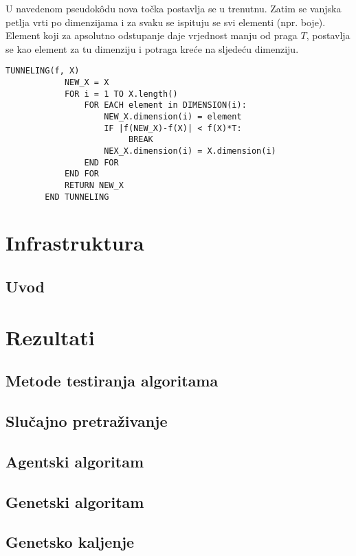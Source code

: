 \documentclass[times, utf8, diplomski, numeric]{fer}
\begin{document}
U navedenom pseudok\^{o}du nova točka postavlja se u trenutnu. Zatim se vanjska petlja vrti po dimenzijama i za svaku se ispituju se svi elementi (npr. boje). Element koji za apsolutno odstupanje daje vrjednost manju od praga $T$, postavlja se kao element za tu dimenziju i potraga kreće na sljedeću dimenziju.

\begin{singlespace}
	\begin{lstlisting}[caption=Metoda tuneliranja - implementacija]
		TUNNELING(f, X)
			NEW_X = X
			FOR i = 1 TO X.length()
				FOR EACH element in DIMENSION(i):
					NEW_X.dimension(i) = element
					IF |f(NEW_X)-f(X)| < f(X)*T:
						 BREAK
					NEX_X.dimension(i) = X.dimension(i)
				END FOR
			END FOR
			RETURN NEW_X
		END TUNNELING
	\end{lstlisting}
\end{singlespace}

\chapter{Infrastruktura}

\section{Uvod}


\chapter{Rezultati}

\section{Metode testiranja algoritama}
\section{Slučajno pretraživanje}
\section{Agentski algoritam}

\section{Genetski algoritam}
\section{Genetsko kaljenje}
\end{document}
